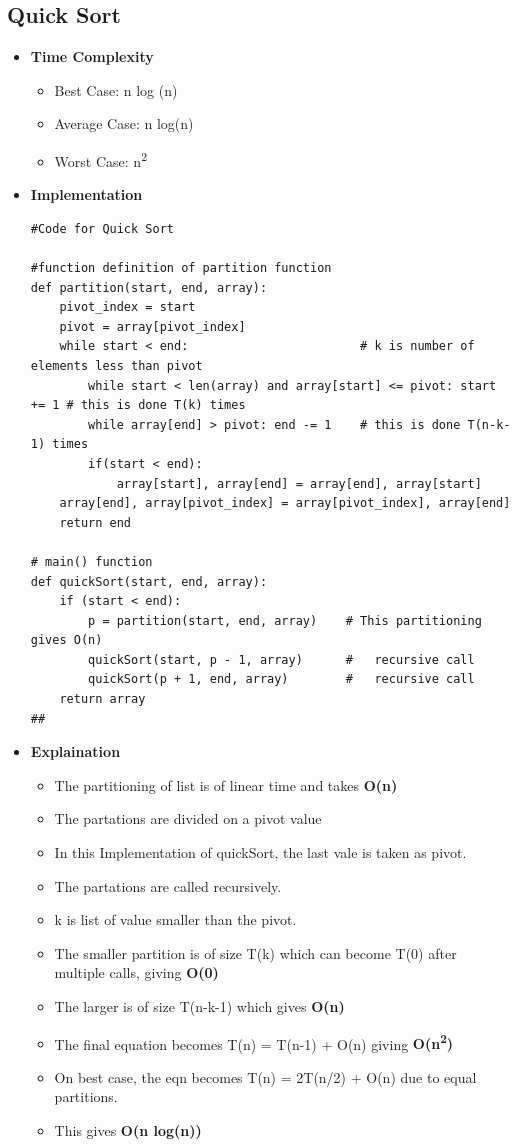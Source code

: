 \documentclass{article}
\begin{document}
\clearpage
\subsection{Quick Sort}
\begin{itemize}
    \item \textbf{Time Complexity}
        \begin{itemize}
            \item Best Case: n log (n)
            \item Average Case: n log(n)
            \item Worst Case: n\textsuperscript{2}
        \end{itemize}
    \item \textbf{Implementation}
\begin{verbatim}
#Code for Quick Sort

#function definition of partition function
def partition(start, end, array):
    pivot_index = start
    pivot = array[pivot_index]
    while start < end:                        # k is number of elements less than pivot
        while start < len(array) and array[start] <= pivot: start += 1 # this is done T(k) times
        while array[end] > pivot: end -= 1    # this is done T(n-k-1) times
        if(start < end):
            array[start], array[end] = array[end], array[start]
    array[end], array[pivot_index] = array[pivot_index], array[end]
    return end

# main() function
def quickSort(start, end, array):
    if (start < end):
        p = partition(start, end, array)    # This partitioning gives O(n)
        quickSort(start, p - 1, array)      #   recursive call
        quickSort(p + 1, end, array)        #   recursive call
    return array
##
\end{verbatim}
    \item \textbf{Explaination}
    \begin{itemize}
        \item The partitioning of list is of linear time and takes \textbf{O(n)}
        \item The partations are divided on a pivot value
        \item In this Implementation of quickSort, the last vale is taken as pivot.
        \item The partations are called recursively.
        \item k is list of value smaller than the pivot.
        \item The smaller partition is of size T(k) which can become T(0) after multiple calls, giving \textbf{O(0)}
        \item The larger is of size T(n-k-1) which gives \textbf{O(n)}
        \item The final equation becomes T(n) = T(n-1) + O(n) giving \textbf{O(n\textsuperscript{2})}
        \item On best case, the eqn becomes T(n) = 2T(n/2) + O(n) due to equal partitions.
        \item This gives \textbf{O(n log(n))}
    \end{itemize}
\end{itemize}
\end{document}
